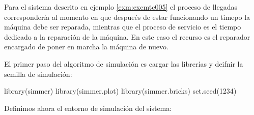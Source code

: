 \documentclass[
]{book}
\newenvironment{Shaded}{\begin{snugshade}}{\end{snugshade}}
\newcommand{\DecValTok}[1]{\textcolor[rgb]{0.00,0.00,0.81}{#1}}
\newcommand{\FunctionTok}[1]{\textcolor[rgb]{0.00,0.00,0.00}{#1}}
\newcommand{\NormalTok}[1]{#1}
\theoremstyle{definition}
\theoremstyle{definition}
\theoremstyle{definition}
\theoremstyle{definition}
\theoremstyle{remark}
\begin{document}
Para el sistema descrito en ejemplo \ref{exm:excmtc005} el proceso de llegadas correspondería al momento en que despueés de estar funcionando un timepo la máquina debe ser reparada, mientras que el proceso de servicio es el tiempo dedicado a la reparación de la máquina. En este caso el recurso es el reparador encargado de poner en marcha la máquina de nuevo.

El primer paso del algoritmo de simulación es cargar las librerías y deifnir la semilla de simulación:

\begin{Shaded}
\begin{Highlighting}[]
\FunctionTok{library}\NormalTok{(simmer)}
\FunctionTok{library}\NormalTok{(simmer.plot)}
\FunctionTok{library}\NormalTok{(simmer.bricks)}
\FunctionTok{set.seed}\NormalTok{(}\DecValTok{1234}\NormalTok{)}
\end{Highlighting}
\end{Shaded}

Definimos ahora el entorno de simulación del sistema:
\end{document}
